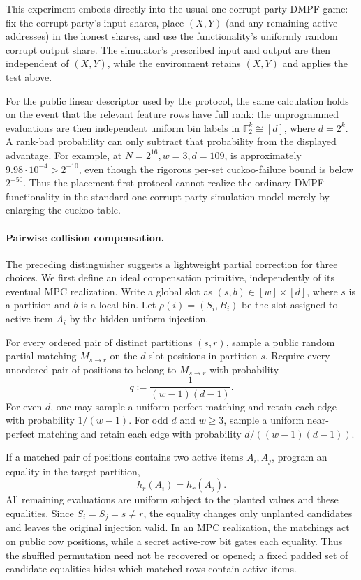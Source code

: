 This experiment embeds directly into the usual one-corrupt-party DMPF game:
fix the corrupt party's input shares, place $(X,Y)$ (and any remaining active
addresses) in the honest shares, and use the functionality's uniformly random
corrupt output share.  The simulator's prescribed input and output are then
independent of $(X,Y)$, while the environment retains $(X,Y)$ and applies the
test above.

For the public linear descriptor used by the protocol, the same calculation
holds on the event that the relevant feature rows have full rank: the
unprogrammed evaluations are then independent uniform bin labels in
$\mathbb F_2^k\cong[d]$, where $d=2^k$.  A rank-bad probability can only subtract that probability
from the displayed advantage.  For example, at
$N=2^{16},w=3,d=109$, 
is approximately $9.98\cdot10^{-4}>2^{-10}$, even though the rigorous
per-set cuckoo-failure bound is below $2^{-50}$.  Thus the placement-first
protocol cannot realize the ordinary DMPF functionality in the standard
one-corrupt-party simulation model merely by enlarging the cuckoo table.

\paragraph{Pairwise collision compensation.}
The preceding distinguisher suggests a lightweight partial correction for
three choices.  We first define an ideal compensation primitive, independently
of its eventual MPC realization.  Write a global slot as $(s,b)\in[w]\times[d]$,
where $s$ is a partition and $b$ is a local bin.  Let
$\rho(i)=(S_i,B_i)$ be the slot assigned to active item $A_i$ by the hidden
uniform injection.

For every ordered pair of distinct partitions $(s,r)$, sample a public random
partial matching $M_{s\mathbin\to r}$ on the $d$ slot positions in partition
$s$.  Require every unordered pair of positions to belong to
$M_{s\mathbin\to r}$ with probability
\begin{equation}\label{eq:rev-cuckoo-compensation-q}
 q:=\frac{1}{(w-1)(d-1)}.
\end{equation}
For even $d$, one may sample a uniform perfect matching and retain each edge
with probability $1/(w-1)$.  For odd $d$ and $w\geq3$, sample a uniform
near-perfect matching and retain each edge with probability
$d/((w-1)(d-1))$.

If a matched pair of positions contains two active items $A_i,A_j$, program
an equality in the target partition,
\begin{equation}\label{eq:rev-cuckoo-compensation-equality}
 h_r(A_i)=h_r(A_j).
\end{equation}
All remaining evaluations are uniform subject to the planted values and these
equalities.  Since $S_i=S_j=s\neq r$, the equality changes only unplanted
candidates and leaves the original injection valid.  In an MPC realization,
the matchings act on public row positions, while a secret active-row bit gates
each equality.  Thus the shuffled permutation need not be recovered or
opened; a fixed padded set of candidate equalities hides which matched rows
contain active items.

